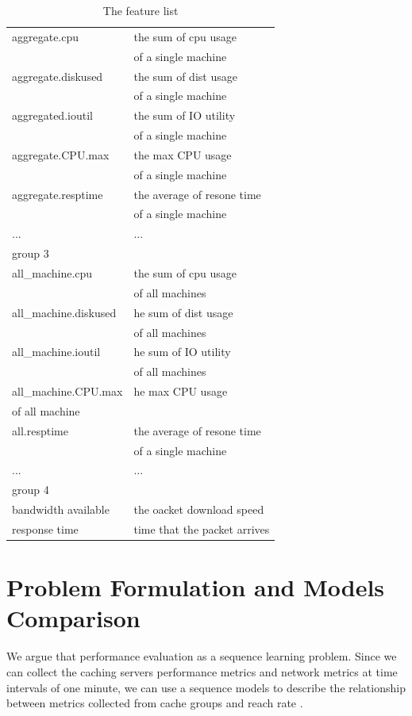 \documentclass[5p]{elsarticle}
\newcommand{\dabiaolv}{reach rate }
\begin{document}
\begin{table}[]
\begin{tabular}{|l|l|}
\hline 
aggregate.cpu& the sum of cpu usage\\
& of a single machine\\
aggregate.diskused& the sum of dist usage\\
& of a single machine\\
aggregated.ioutil& the sum of IO utility\\
& of a single machine\\
aggregate.CPU.max& the max CPU usage\\
& of a single machine\\
aggregate.resptime&the average of resone time\\
& of a single machine\\
...&...\\
\hline  
group 3&\\
\hline
all\_machine.cpu& the sum of cpu usage\\
& of all machines\\
all\_machine.diskused& he sum of dist usage\\
& of all machines\\
all\_machine.ioutil& he sum of IO utility\\
& of all machines\\
all\_machine.CPU.max& he max CPU usage\\
 of all machine\\
all.resptime&the average of resone time\\
& of a single machine\\
...&...\\
\hline
group 4&\\
\hline
bandwidth available & the oacket download speed \\
response time & time that the packet arrives\\
\hline
\end{tabular}
\caption{The feature list}
\label{feature_list}
\end{table}



\section{Problem Formulation and Models Comparison}



We argue that performance evaluation as a sequence learning problem. Since we can collect the caching servers performance metrics and network metrics at time intervals of one minute, we can use a sequence models to describe the relationship between metrics collected from cache groups and \dabiaolv.
\end{document}
